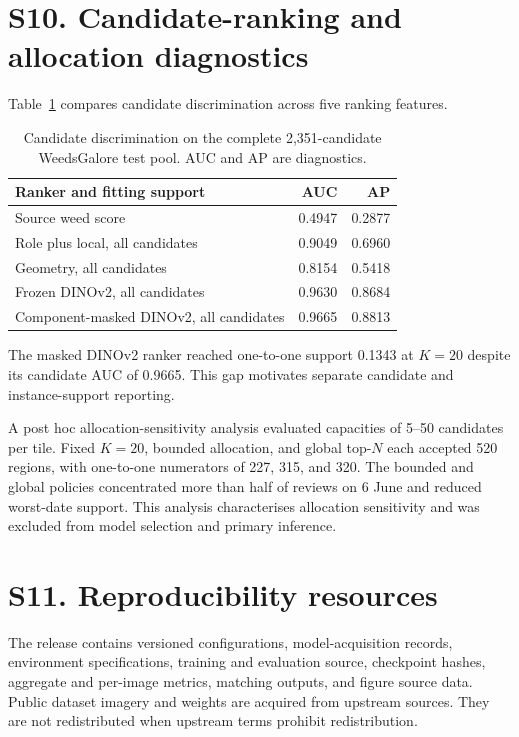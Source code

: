\documentclass[preprint,12pt]{elsarticle}
\begin{document}
\section{S10. Candidate-ranking and allocation diagnostics}

Table~\ref{tab:s10ranking} compares candidate discrimination across five ranking features.

\begin{table}[htbp]
\centering
\caption{Candidate discrimination on the complete 2,351-candidate WeedsGalore test pool. AUC and AP are diagnostics.}
\label{tab:s10ranking}
\small
\begin{tabular}{lrr}
\toprule
Ranker and fitting support & AUC & AP \\
\midrule
Source weed score & 0.4947 & 0.2877 \\
Role plus local, all candidates & 0.9049 & 0.6960 \\
Geometry, all candidates & 0.8154 & 0.5418 \\
Frozen DINOv2, all candidates & 0.9630 & 0.8684 \\
Component-masked DINOv2, all candidates & 0.9665 & 0.8813 \\
\bottomrule
\end{tabular}
\end{table}

The masked DINOv2 ranker reached one-to-one support 0.1343 at $K=20$ despite its candidate AUC of 0.9665. This gap motivates separate candidate and instance-support reporting.

A post hoc allocation-sensitivity analysis evaluated capacities of 5--50 candidates per tile. Fixed $K=20$, bounded allocation, and global top-$N$ each accepted 520 regions, with one-to-one numerators of 227, 315, and 320. The bounded and global policies concentrated more than half of reviews on 6 June and reduced worst-date support. This analysis characterises allocation sensitivity and was excluded from model selection and primary inference.

\section{S11. Reproducibility resources}

The release contains versioned configurations, model-acquisition records, environment specifications, training and evaluation source, checkpoint hashes, aggregate and per-image metrics, matching outputs, and figure source data. Public dataset imagery and weights are acquired from upstream sources. They are not redistributed when upstream terms prohibit redistribution.
\end{document}

